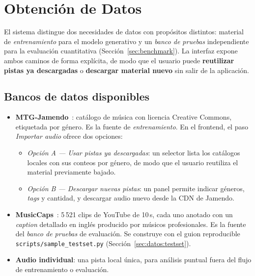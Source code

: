 
\section{Obtención de Datos}
\label{sec:datos}

El sistema distingue dos necesidades de datos con propósitos distintos:
material de \emph{entrenamiento} para el modelo generativo y un \emph{banco
de pruebas} independiente para la evaluación cuantitativa
(Sección~\ref{sec:benchmark}).
La interfaz expone ambos caminos de forma explícita, de modo que el usuario
puede \textbf{reutilizar pistas ya descargadas} o \textbf{descargar material
nuevo} sin salir de la aplicación.

\subsection{Bancos de datos disponibles}
\label{sec:datos:bancos}

\begin{itemize}
  \item \textbf{MTG-Jamendo}~\cite{bogdanov2019mtg}: catálogo de música con
        licencia Creative Commons, etiquetada por género. Es la fuente de
        \emph{entrenamiento}. En el frontend, el paso \textit{Importar audio}
        ofrece dos opciones:
        \begin{itemize}
          \item \textit{Opción A — Usar pistas ya descargadas}: un selector
                lista los catálogos locales con sus conteos por género, de
                modo que el usuario reutiliza el material previamente bajado.
          \item \textit{Opción B — Descargar nuevas pistas}: un panel permite
                indicar géneros, \textit{tags} y cantidad, y descargar audio
                nuevo desde la CDN de Jamendo.
        \end{itemize}
  \item \textbf{MusicCaps}~\cite{agostinelli2023musiclm}: 5\,521 clips de
        YouTube de 10\,s, cada uno anotado con un \textit{caption} detallado
        en inglés producido por músicos profesionales. Es la fuente del
        \emph{banco de pruebas} de evaluación. Se construye con el guion
        reproducible \texttt{scripts/sample\_testset.py}
        (Sección~\ref{sec:datos:testset}).
  \item \textbf{Audio individual}: una pista local única, para análisis
        puntual fuera del flujo de entrenamiento o evaluación.
\end{itemize}


